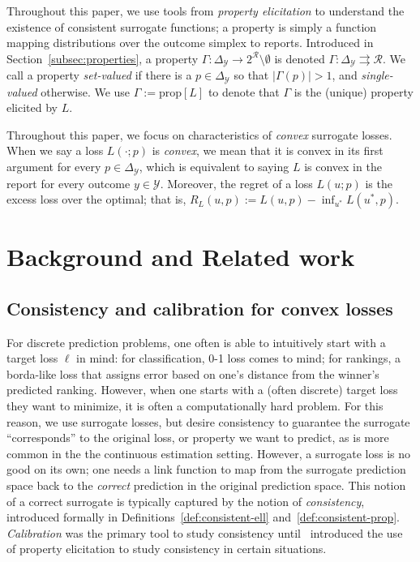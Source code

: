 \documentclass{article}
\newcommand{\simplex}{\Delta_\Y}
\newcommand{\prop}[1]{\mathrm{prop}[#1]}
\newcommand{\R}{\mathcal{R}}
\newcommand{\Y}{\mathcal{Y}}
\newcommand{\toto}{\rightrightarrows}
\begin{document}
Throughout this paper, we use tools from \emph{property elicitation} to understand the existence of consistent surrogate functions; a property is simply a function mapping distributions over the outcome simplex to reports.
Introduced in Section~\ref{subsec:properties}, a property $\Gamma: \simplex \to 2^\R \setminus \emptyset$ is denoted $\Gamma:\simplex \toto \R$.
We call a property \emph{set-valued} if there is a $p \in \simplex$ so that $|\Gamma(p)| > 1$, and \emph{single-valued} otherwise.
We use $\Gamma := \prop{L}$ to denote that $\Gamma$ is the (unique) property elicited by $L$.

Throughout this paper, we focus on characteristics of \emph{convex} surrogate losses.
When we say a loss $L(\cdot; p)$ is \emph{convex}, we mean that it is convex in its first argument for every $p \in \simplex$, which is equivalent to saying $L$ is convex in the report for every outcome $y \in \Y$.
Moreover, the regret of a loss $L(u; p)$ is the excess loss over the optimal; that is, $R_L(u,p) := L(u,p) - \inf_{u^*} L(u^*, p)$.

\section{Background and Related work}\label{sec:related-work}

\subsection{Consistency and calibration for convex losses}\label{subsec:convex-surrogates}

For discrete prediction problems, one often is able to intuitively start with a target loss $\ell$ in mind: for classification, 0-1 loss comes to mind; for rankings, a borda-like loss that assigns error based on one's distance from the winner's predicted ranking.
However, when one starts with a (often discrete) target loss they want to minimize, it is often a computationally hard problem.
For this reason, we use surrogate losses, but desire consistency to guarantee the surrogate ``corresponds'' to the original loss, or property we want to predict, as is more common in the the continuous estimation setting.
However, a surrogate loss is no good on its own; one needs a link function to map from the surrogate prediction space back to the \emph{correct} prediction in the original prediction space.
This notion of a correct surrogate is typically captured by the notion of \emph{consistency}, introduced formally in Definitions~\ref{def:consistent-ell} and~\ref{def:consistent-prop}.
\emph{Calibration} was the primary tool to study consistency until~\cite{agarwal2015consistent} introduced the use of property elicitation to study consistency in certain situations.
\end{document}
